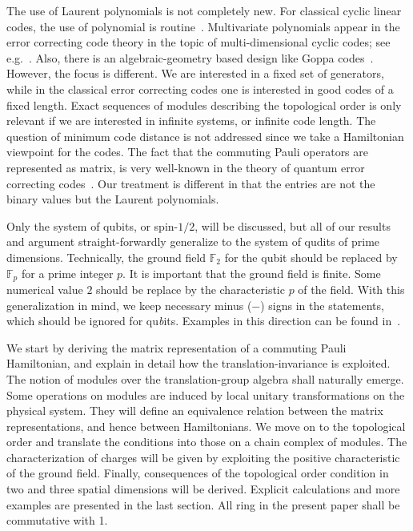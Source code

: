 \documentclass[letterpaper,12pt]{amsart}
\theoremstyle{definition} \newtheorem{defn}{Definition}
\theoremstyle{definition} \newtheorem{rem}{Remark}
\theoremstyle{definition} \newtheorem{example}{Example}
\newcommand{\FF}{\mathbb{F}}
\begin{document}
The use of Laurent polynomials is not completely new.
For classical cyclic linear codes, the use of polynomial is routine~\cite{MacWilliamsSloane1977}.
Multivariate polynomials appear in the error correcting code theory
in the topic of multi-dimensional cyclic codes; see e.g.~\cite{GueneriOezbudak2008}.
Also, there is an algebraic-geometry based design like Goppa codes~\cite{Goppa1983}.
However, the focus is different.
We are interested in a fixed set of generators,
while in the classical error correcting codes one is interested in good codes of a fixed length.
Exact sequences of modules describing the topological order is only relevant
if we are interested in infinite systems, or infinite code length.
The question of minimum code distance is not addressed
since we take a Hamiltonian viewpoint for the codes.
The fact that the commuting Pauli operators are represented as matrix,
is very well-known in the theory of quantum error correcting 
codes~\cite{CalderbankShor1996Good,Steane1996Multiple,Gottesman1996Saturating,CalderbankRainsShorEtAl1997Quantum}.
Our treatment is different in that the entries are not the binary values but the Laurent polynomials.


Only the system of qubits, or spin-$1/2$, will be discussed,
but all of our results and argument straight-forwardly
generalize to the system of qudits of prime dimensions.
Technically, the ground field $\FF_2$ for the qubit should be
replaced by $\FF_p$ for a prime integer $p$.
It is important that the ground field is finite.
Some numerical value $2$ should be replace by the characteristic $p$ of the field.
With this generalization in mind, we keep necessary minus ($-$) signs in the statements,
which should be ignored for qu\emph{b}its.
Examples in this direction can be found in~\cite{Kim2012qupit}.


We start by deriving the matrix representation of a commuting Pauli Hamiltonian,
and explain in detail how the translation-invariance is exploited.
The notion of modules over the translation-group algebra shall naturally emerge.
Some operations on modules are induced by local unitary transformations on the physical system.
They will define an equivalence relation between the matrix representations, and hence between Hamiltonians.
We move on to the topological order and translate the conditions
into those on a chain complex of modules.
The characterization of charges will be given
by exploiting the positive characteristic of the ground field.
Finally, consequences of the topological order condition
in two and three spatial dimensions will be derived.
Explicit calculations and more examples are presented in the last section.
All ring in the present paper shall be commutative with 1.
\end{document}
